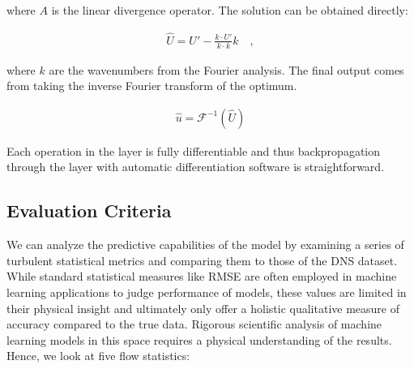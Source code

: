 \documentclass[book.tex]{subfiles}
\begin{document}
where $A$ is the linear divergence operator. The solution can be obtained directly:

\begin{align}
    \hat{U} = U'-\frac{k\cdot U'}{k\cdot k}k \quad ,
\end{align}

where $k$ are the wavenumbers from the Fourier analysis. The final output comes from taking the inverse Fourier transform of the optimum.

\begin{align}
    \hat{u}=\mathcal{F}^{-1}(\hat{U})
\end{align}

Each operation in the layer is fully differentiable and thus backpropagation through the layer with automatic differentiation software is straightforward. 


\subsection{Evaluation Criteria}

We can analyze the predictive capabilities of the model by examining a series of turbulent statistical metrics and comparing them to those of the DNS dataset. While standard statistical measures like RMSE are often employed in machine learning applications to judge performance of models, these values are limited in their physical insight and ultimately only offer a holistic qualitative measure of accuracy compared to the true data. Rigorous scientific analysis of machine learning models in this space requires a physical understanding of the results. Hence, we look at five flow statistics: %

\end{document}
